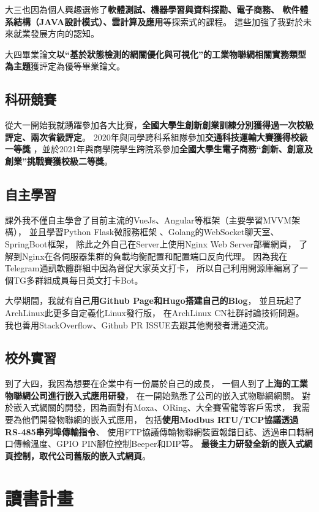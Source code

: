 \documentclass[classical]{einfart}
\begin{document}
大三也因為個人興趣選修了\textbf{軟體測試、機器學習與資料探勘、電子商務、
軟件體系結構（JAVA設計模式）、雲計算及應用}等探索式的課程。
這些加強了我對於未來就業發展方向的認知。

大四畢業論文\textbf{以“基於狀態檢測的網關優化與可視化”的工業物聯網相關實務類型為主題}獲評定為優等畢業論文。

\subsection{科研競賽}

從大一開始我就踴躍參加各大比賽，\textbf{全國大學生創新創業訓練分別獲得過一次校級評定、兩次省級評定}。
2020年與同學跨科系組隊參加\textbf{交通科技運輸大賽獲得校級一等獎}
，並於2021年與商學院學生跨院系參加\textbf{全國大學生電子商務“創新、創意及創業”挑戰賽獲校級二等獎}。

\subsection{自主學習}

課外我不僅自主學會了目前主流的VueJs、Angular等框架（主要學習MVVM架構），
並且學習Python Flask微服務框架
、Golang的WebSocket聊天室、SpringBoot框架，
除此之外自己在Server上使用Nginx Web Server部署網頁，
了解到Nginx在各伺服器集群的負載均衡配置和配置端口反向代理。
因為我在Telegram通訊軟體群組中因為督促大家英文打卡，
所以自己利用開源庫編寫了一個TG多群組成員每日英文打卡Bot。

大學期間，我就有自己\textbf{用Github Page和Hugo搭建自己的Blog}，
並且玩起了ArchLinux此更多自定義化Linux發行版，
在ArchLinux CN社群討論技術問題。
我也善用StackOverflow、Github PR ISSUE去跟其他開發者溝通交流。

\subsection{校外實習}

到了大四，我因為想要在企業中有一份屬於自己的成長，
一個人到了\textbf{上海的工業物聯網公司進行嵌入式應用研發}，
在一開始熟悉了公司的嵌入式物聯網網關。
對於嵌入式網關的開發，因為面對有Moxa、ORing、大全賽雪龍等客戶需求，
我需要為他們開發物聯網的嵌入式應用，
包括\textbf{使用Modbus RTU/TCP協議透過RS-485串列埠傳輸指令}、
使用FTP協議傳輸物聯網裝置報錯日誌、透過串口轉網口傳輸溫度、GPIO PIN腳位控制Beeper和DIP等。
\textbf{最後主力研發全新的嵌入式網頁控制，取代公司舊版的嵌入式網頁}。


\section{讀書計畫}
\end{document}
